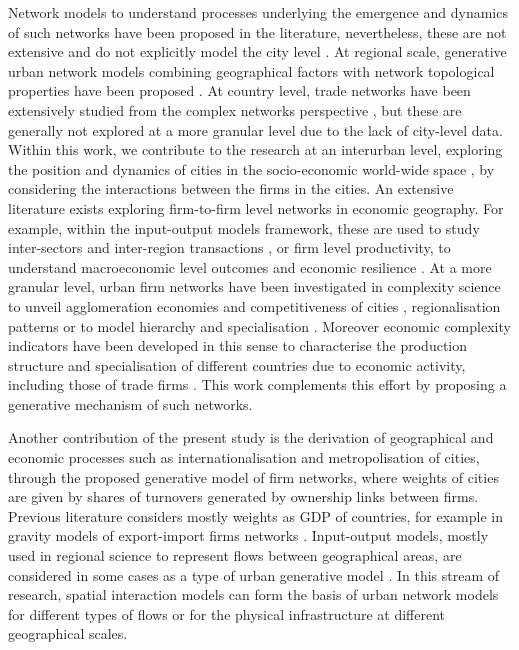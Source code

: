 \documentclass[10pt,letterpaper]{article}
\begin{document}
Network models to understand processes underlying the emergence and dynamics of such networks have been proposed in the literature, nevertheless, these are not extensive and do not explicitly model the city level \cite{taylor2001specification}. At regional scale, generative urban network models combining geographical factors with network topological properties have been proposed \cite{dai2016simulating}. At country level, trade networks have been extensively studied from the complex networks perspective \cite{garlaschelli2005structure}, but these are generally not explored at a more granular level due to the lack of city-level data. Within this work, we contribute to the research at an interurban level, exploring the position and dynamics of cities in the socio-economic world-wide space \cite{pumain2018evolutionary} \cite{berry1964cities}, by considering the interactions between the firms in the cities. An extensive literature exists exploring firm-to-firm level networks in economic geography. For example, within the input-output models framework, these are used to study inter-sectors and inter-region transactions \cite{Rodriguesetal2016}, or firm level productivity, to understand macroeconomic level outcomes \cite{Grassi2016} and economic resilience \cite{Ialongo2021}. At a more granular level, urban firm networks have been investigated in complexity science \cite{RozenblatNeal2021} to unveil agglomeration economies and competitiveness of cities \cite{Rozenblat2010}, regionalisation patterns \cite{Rozenblatetal2017} or to model hierarchy and specialisation \cite{BidaRozenblat2020}. Moreover economic complexity indicators have been developed in this sense to characterise the production structure and specialisation of different countries due to economic activity, including those of trade firms \cite{HaussmanHidalgo2009,OCleary2016}. This work complements this effort by proposing a generative mechanism of such networks. 

Another contribution of the present study is the derivation of geographical and economic processes such as internationalisation and metropolisation of cities, through the proposed generative model of firm networks, where weights of cities are given by shares of turnovers generated by ownership links between firms. Previous literature considers mostly weights as GDP of countries, for example in gravity models of export-import firms networks \cite{Kepaptsogloual2010} \cite{MinondoRequena2013}. Input-output models, mostly used in regional science to represent flows between geographical areas, are considered in some cases as a type of urban generative model \cite{jin1993generation}. In this stream of research, spatial interaction models \cite{dennett2013multilevel} can form the basis of urban network models for different types of flows \cite{dai2016generative} or for the physical infrastructure \cite{raimbault2018indirect} at different geographical scales. 
\end{document}
